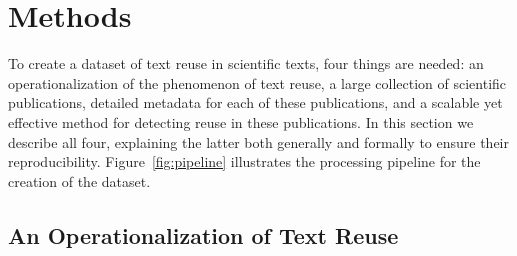 \section*{Methods}
\label{sec:method}



To create a dataset of text reuse in scientific texts, four things are needed: an operationalization of the phenomenon of text reuse, a large collection of scientific publications, detailed metadata for each of these publications, and a scalable yet effective method for detecting reuse in these publications. In this section we describe all four, explaining the latter both generally and formally to ensure their reproducibility.
Figure~\ref{fig:pipeline} illustrates the processing pipeline for the creation of the dataset. 

\subsection*{An Operationalization of Text Reuse}

